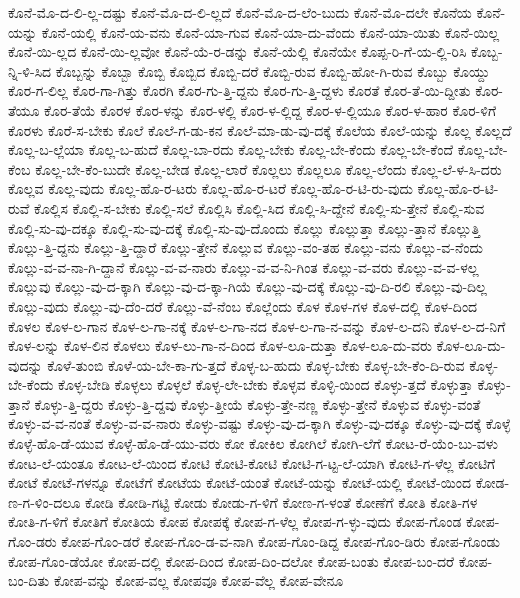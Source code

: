 {ಕೊನೆ-ಮೊ-ದ-ಲಿ-ಲ್ಲ-ದಷ್ಟು
ಕೊನೆ-ಮೊ-ದ-ಲಿ-ಲ್ಲದೆ
ಕೊನೆ-ಮೊ-ದ-ಲೆಂ-ಬುದು
ಕೊನೆ-ಮೊ-ದಲೇ
ಕೊನೆಯ
ಕೊನೆ-ಯನ್ನು
ಕೊನೆ-ಯಲ್ಲಿ
ಕೊನೆ-ಯ-ವನು
ಕೊನೆ-ಯಾ-ಗುವ
ಕೊನೆ-ಯಾ-ದು-ವೆಂದು
ಕೊನೆ-ಯಾ-ಯಿತು
ಕೊನೆ-ಯಿಲ್ಲ
ಕೊನೆ-ಯಿ-ಲ್ಲದ
ಕೊನೆ-ಯಿ-ಲ್ಲವೋ
ಕೊನೆ-ಯೆ-ರ-ಡನ್ನು
ಕೊನೆ-ಯೆಲ್ಲಿ
ಕೊನೆಯೇ
ಕೊಪ್ಪ-ರಿ-ಗೆ-ಯ-ಲ್ಲಿ-ರಿಸಿ
ಕೊಬ್ಬ-ನ್ನಿ-ಳಿ-ಸಿದ
ಕೊಬ್ಬನ್ನು
ಕೊಬ್ಬಾ
ಕೊಬ್ಬಿ
ಕೊಬ್ಬಿದ
ಕೊಬ್ಬಿ-ದರೆ
ಕೊಬ್ಬಿ-ರುವ
ಕೊಬ್ಬಿ-ಹೋ-ಗಿ-ರುವ
ಕೊಬ್ಬು
ಕೊಯ್ದು
ಕೊರ-ಗ-ಲಿಲ್ಲ
ಕೊರ-ಗಾ-ಗಿತ್ತು
ಕೊರಗಿ
ಕೊರ-ಗು-ತ್ತಿ-ದ್ದನು
ಕೊರ-ಗು-ತ್ತಿ-ದ್ದಳು
ಕೊರತೆ
ಕೊರ-ತೆ-ಯಿ-ದ್ದೀತು
ಕೊರ-ತೆಯೂ
ಕೊರ-ತೆಯೆ
ಕೊರಳ
ಕೊರ-ಳನ್ನು
ಕೊರ-ಳಲ್ಲಿ
ಕೊರ-ಳ-ಲ್ಲಿದ್ದ
ಕೊರ-ಳ-ಲ್ಲಿಯೂ
ಕೊರ-ಳ-ಹಾರ
ಕೊರ-ಳಿಗೆ
ಕೊರಳು
ಕೊರೆ-ಸ-ಬೇಕು
ಕೊಲೆ
ಕೊಲೆ-ಗ-ಡು-ಕನ
ಕೊಲೆ-ಮಾ-ಡು-ವು-ದಕ್ಕೆ
ಕೊಲೆಯ
ಕೊಲೆ-ಯನ್ನು
ಕೊಲ್ಲ
ಕೊಲ್ಲದೆ
ಕೊಲ್ಲ-ಬ-ಲ್ಲೆಯಾ
ಕೊಲ್ಲ-ಬ-ಹುದೆ
ಕೊಲ್ಲ-ಬಾ-ರದು
ಕೊಲ್ಲ-ಬೇಕು
ಕೊಲ್ಲ-ಬೇ-ಕೆಂದು
ಕೊಲ್ಲ-ಬೇ-ಕೆಂದೆ
ಕೊಲ್ಲ-ಬೇ-ಕೆಂಬ
ಕೊಲ್ಲ-ಬೇ-ಕೆಂ-ಬುದೇ
ಕೊಲ್ಲ-ಬೇಡ
ಕೊಲ್ಲ-ಲಾರೆ
ಕೊಲ್ಲಲು
ಕೊಲ್ಲಲೂ
ಕೊಲ್ಲ-ಲೆಂದು
ಕೊಲ್ಲ-ಲೆ-ಳ-ಸಿ-ದರು
ಕೊಲ್ಲವ
ಕೊಲ್ಲ-ವುದು
ಕೊಲ್ಲ-ಹೊ-ರ-ಟರು
ಕೊಲ್ಲ-ಹೊ-ರ-ಟರೆ
ಕೊಲ್ಲ-ಹೊ-ರ-ಟಿ-ರು-ವುದು
ಕೊಲ್ಲ-ಹೊ-ರ-ಟಿ-ರುವೆ
ಕೊಲ್ಲಿಸ
ಕೊಲ್ಲಿ-ಸ-ಬೇಕು
ಕೊಲ್ಲಿ-ಸಲೆ
ಕೊಲ್ಲಿಸಿ
ಕೊಲ್ಲಿ-ಸಿದ
ಕೊಲ್ಲಿ-ಸಿ-ದ್ದೇನೆ
ಕೊಲ್ಲಿ-ಸು-ತ್ತೇನೆ
ಕೊಲ್ಲಿ-ಸುವ
ಕೊಲ್ಲಿ-ಸು-ವು-ದಕ್ಕೂ
ಕೊಲ್ಲಿ-ಸು-ವು-ದಕ್ಕೆ
ಕೊಲ್ಲಿ-ಸು-ವು-ದೊಂದು
ಕೊಲ್ಲು
ಕೊಲ್ಲುತ್ತಾ
ಕೊಲ್ಲು-ತ್ತಾನೆ
ಕೊಲ್ಲುತ್ತಿ
ಕೊಲ್ಲು-ತ್ತಿ-ದ್ದನು
ಕೊಲ್ಲು-ತ್ತಿ-ದ್ದಾರೆ
ಕೊಲ್ಲು-ತ್ತೇನೆ
ಕೊಲ್ಲುವ
ಕೊಲ್ಲು-ವಂ-ತಹ
ಕೊಲ್ಲು-ವನು
ಕೊಲ್ಲು-ವ-ನೆಂದು
ಕೊಲ್ಲು-ವ-ವ-ನಾ-ಗಿ-ದ್ದಾನೆ
ಕೊಲ್ಲು-ವ-ವ-ನಾರು
ಕೊಲ್ಲು-ವ-ವ-ನಿ-ಗಿಂತ
ಕೊಲ್ಲು-ವ-ವರು
ಕೊಲ್ಲು-ವ-ವ-ಳಲ್ಲ
ಕೊಲ್ಲುವು
ಕೊಲ್ಲು-ವು-ದ-ಕ್ಕಾಗಿ
ಕೊಲ್ಲು-ವು-ದ-ಕ್ಕಾ-ಗಿಯೆ
ಕೊಲ್ಲು-ವು-ದಕ್ಕೆ
ಕೊಲ್ಲು-ವು-ದಿ-ರಲಿ
ಕೊಲ್ಲು-ವು-ದಿಲ್ಲ
ಕೊಲ್ಲು-ವುದು
ಕೊಲ್ಲು-ವು-ದೆಂ-ದರೆ
ಕೊಲ್ಲು-ವೆ-ನೆಂಬ
ಕೊಲ್ಲೆಂದು
ಕೊಳ
ಕೊಳ-ಗಳ
ಕೊಳ-ದಲ್ಲಿ
ಕೊಳ-ದಿಂದ
ಕೊಳಲ
ಕೊಳ-ಲ-ಗಾನ
ಕೊಳ-ಲ-ಗಾ-ನಕ್ಕೆ
ಕೊಳ-ಲ-ಗಾ-ನದ
ಕೊಳ-ಲ-ಗಾ-ನ-ವನ್ನು
ಕೊಳ-ಲ-ದನಿ
ಕೊಳ-ಲ-ದ-ನಿಗೆ
ಕೊಳ-ಲನ್ನು
ಕೊಳ-ಲಿನ
ಕೊಳಲು
ಕೊಳ-ಲು-ಗಾ-ನ-ದಿಂದ
ಕೊಳ-ಲೂ-ದುತ್ತಾ
ಕೊಳ-ಲೂ-ದು-ವರು
ಕೊಳ-ಲೂ-ದು-ವುದನ್ನು
ಕೊಳೆ-ತುಂಬಿ
ಕೊಳೆ-ಯ-ಬೇ-ಕಾ-ಗು-ತ್ತದೆ
ಕೊಳ್ಳ-ಬ-ಹುದು
ಕೊಳ್ಳ-ಬೇಕು
ಕೊಳ್ಳ-ಬೇ-ಕೆಂ-ದಿ-ರುವ
ಕೊಳ್ಳ-ಬೇ-ಕೆಂದು
ಕೊಳ್ಳ-ಬೇಡಿ
ಕೊಳ್ಳಲು
ಕೊಳ್ಳಲೆ
ಕೊಳ್ಳ-ಲೇ-ಬೇಕು
ಕೊಳ್ಳವ
ಕೊಳ್ಳಿ-ಯಿಂದ
ಕೊಳ್ಳು-ತ್ತದೆ
ಕೊಳ್ಳುತ್ತಾ
ಕೊಳ್ಳು-ತ್ತಾನೆ
ಕೊಳ್ಳು-ತ್ತಿ-ದ್ದರು
ಕೊಳ್ಳು-ತ್ತಿ-ದ್ದವು
ಕೊಳ್ಳು-ತ್ತೀಯೆ
ಕೊಳ್ಳು-ತ್ತೇ-ನಣ್ಣ
ಕೊಳ್ಳು-ತ್ತೇನೆ
ಕೊಳ್ಳುವ
ಕೊಳ್ಳು-ವಂತೆ
ಕೊಳ್ಳು-ವ-ವ-ನಂತೆ
ಕೊಳ್ಳು-ವ-ವ-ನಾರು
ಕೊಳ್ಳು-ವಷ್ಟು
ಕೊಳ್ಳು-ವು-ದ-ಕ್ಕಾಗಿ
ಕೊಳ್ಳು-ವು-ದಕ್ಕೂ
ಕೊಳ್ಳು-ವು-ದಕ್ಕೆ
ಕೊಳ್ಳೆ
ಕೊಳ್ಳೆ-ಹೊ-ಡೆ-ಯುವ
ಕೊಳ್ಳೆ-ಹೊ-ಡೆ-ಯು-ವರು
ಕೋ
ಕೋಕಿಲ
ಕೋಗಿಲೆ
ಕೋಗಿ-ಲೆಗೆ
ಕೋಟ-ರೆ-ಯೆಂ-ಬು-ವಳು
ಕೋಟ-ಲೆ-ಯಂತೂ
ಕೋಟ-ಲೆ-ಯಿಂದ
ಕೋಟಿ
ಕೋಟಿ-ಕೋಟಿ
ಕೋಟಿ-ಗ-ಟ್ಟ-ಲೆ-ಯಾಗಿ
ಕೋಟಿ-ಗ-ಳೆಲ್ಲ
ಕೋಟಿಗೆ
ಕೋಟೆ
ಕೋಟೆ-ಗಳನ್ನೂ
ಕೋಟೆಗೆ
ಕೋಟೆಯ
ಕೋಟೆ-ಯಂತೆ
ಕೋಟೆ-ಯನ್ನು
ಕೋಟೆ-ಯಲ್ಲಿ
ಕೋಟೆ-ಯಿಂದ
ಕೋಡ-ಣ-ಗ-ಳಿಂ-ದಲೂ
ಕೋಡಿ
ಕೋಡಿ-ಗಟ್ಟಿ
ಕೋಡು
ಕೋಡು-ಗ-ಳಿಗೆ
ಕೋಣ-ಗ-ಳಂತೆ
ಕೋಣೆಗೆ
ಕೋತಿ
ಕೋತಿ-ಗಳ
ಕೋತಿ-ಗ-ಳಿಗೆ
ಕೋತಿಗೆ
ಕೋತಿಯ
ಕೋಪ
ಕೋಪಕ್ಕೆ
ಕೋಪ-ಗ-ಳೆಲ್ಲ
ಕೋಪ-ಗ-ಳ್ಳು-ವುದು
ಕೋಪ-ಗೊಂಡ
ಕೋಪ-ಗೊಂ-ಡರು
ಕೋಪ-ಗೊಂ-ಡರೆ
ಕೋಪ-ಗೊಂ-ಡ-ವ-ನಾಗಿ
ಕೋಪ-ಗೊಂ-ಡಿದ್ದ
ಕೋಪ-ಗೊಂ-ಡಿರು
ಕೋಪ-ಗೊಂಡು
ಕೋಪ-ಗೊಂ-ಡೆಯೋ
ಕೋಪ-ದಲ್ಲಿ
ಕೋಪ-ದಿಂದ
ಕೋಪ-ದಿಂ-ದಲೋ
ಕೋಪ-ಬಂತು
ಕೋಪ-ಬಂ-ದರೆ
ಕೋಪ-ಬಂ-ದಿತು
ಕೋಪ-ವನ್ನು
ಕೋಪ-ವಲ್ಲ
ಕೋಪವೂ
ಕೋಪ-ವೆಲ್ಲ
ಕೋಪ-ವೇನೂ
}
